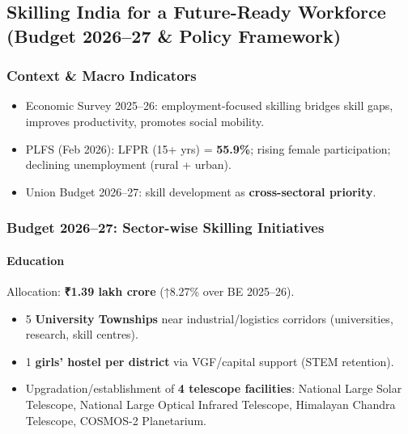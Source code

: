 \subsection{Skilling India for a Future-Ready Workforce (Budget 2026--27 \& Policy Framework)}

\subsubsection*{Context \& Macro Indicators}
\begin{itemize}
  \item Economic Survey 2025--26: employment-focused skilling bridges skill gaps, improves productivity, promotes social mobility.
  \item PLFS (Feb 2026): LFPR (15+ yrs) = \textbf{55.9\%}; rising female participation; declining unemployment (rural + urban).
  \item Union Budget 2026--27: skill development as \textbf{cross-sectoral priority}.
\end{itemize}

\subsubsection*{Budget 2026--27: Sector-wise Skilling Initiatives}

\paragraph{Education} Allocation: \textbf{₹1.39 lakh crore} (↑8.27\% over BE 2025--26).
\begin{itemize}
  \item 5 \textbf{University Townships} near industrial/logistics corridors (universities, research, skill centres).
  \item 1 \textbf{girls' hostel per district} via VGF/capital support (STEM retention).
  \item Upgradation/establishment of \textbf{4 telescope facilities}: National Large Solar Telescope, National Large Optical Infrared Telescope, Himalayan Chandra Telescope, COSMOS-2 Planetarium.
\end{itemize}

